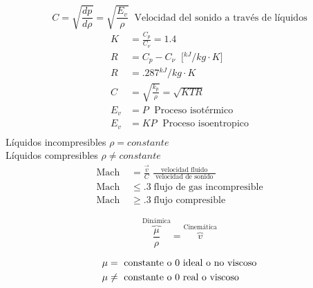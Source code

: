 \[
    C = \sqrt{ \frac{ dp }{ d\rho } } = \sqrt{ \frac{ E_{v} }{ \rho } } \;\; \text{Velocidad del sonido a través de líquidos}
\]
\[
    \begin{split}
        K & = \frac{ C_{p} }{ C_{\nu} } = 1.4 \\
        R & = C_{p} - C_{ \nu } \;\; \Big[ {}^{kJ}/{ kg \cdot K } \Big] \\
        R & = .287 {}^{kJ}/{ kg \cdot K } \\
        C & = \sqrt{ \frac{ k_{p} }{ \rho } } = \sqrt{KTR} \\
        E_{v} & = P \; \text{ Proceso isotérmico} \\
        E_{v} & = KP \; \text{ Proceso isoentropico} \\
    \end{split}
\]
Líquidos incompresibles \( \rho = constante \) \\
Líquidos compresibles \( \rho \not = constante \) 
\[
    \begin{split}
        \text{Mach } & = \frac{ \Vec{v} }{ C } \; \frac{ \text{velocidad fluido} }{ \text{ velocidad de sonido } } \\
        \text{Mach } & \leq .3 \; \text{flujo de gas incompresible} \\
        \text{Mach } & \geq .3 \; \text{flujo compresible}
    \end{split}
\]

\[
    \overbrace{ \frac{ \mu }{ \rho } }^{ \text{Dinámica} } = \overbrace{ v }^{ \text{Cinemática} }
\]

\[
    \begin{split}
        \mu & = \text{ constante o \( 0 \) ideal o no viscoso} \\
        \mu & \not = \text{ constante o \( 0 \) real o viscoso }
    \end{split}
\]


